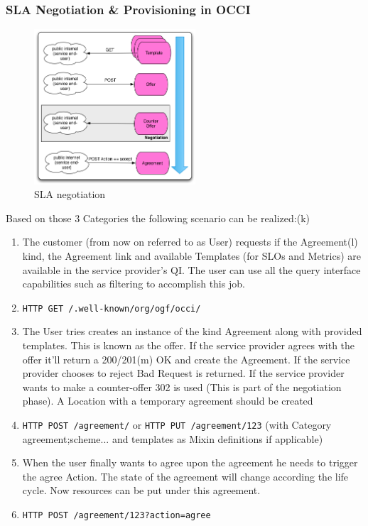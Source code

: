 \documentclass[12pt]{article}  %
\begin{document}
\subsubsection{SLA Negotiation \& Provisioning in OCCI}

\begin{figure}
\centering
\includegraphics[width=60mm]{sla-occi-agreement.png}
\caption{\label{sla-agreement} SLA negotiation}
\end{figure}



Based on those 3 Categories the following scenario can be realized:(k)

\begin{enumerate}
\item The customer (from now on referred to as User) requests if the Agreement(l) kind, the Agreement link and available Templates (for SLOs and Metrics) are available in the service provider’s QI. The user can use all the query interface capabilities such as filtering to accomplish this job.
\item \verb|HTTP GET /.well-known/org/ogf/occi/|
\item The User tries creates an instance of the kind Agreement along with provided templates. This is known as the offer. If the service provider agrees with the offer it’ll return a 200/201(m) OK and create the Agreement. If the service provider chooses to reject Bad Request is returned. If the service provider wants to make a counter-offer 302 is used (This is part of the negotiation phase). A Location with a temporary agreement should be created
\item \verb|HTTP POST /agreement/| or \verb|HTTP PUT /agreement/123| (with Category agreement;scheme... and templates as Mixin definitions if applicable)
\item When the user finally wants to agree upon the agreement he needs to trigger the agree Action. The state of the agreement will change according the life cycle. Now resources can be put under this agreement.
\item \verb|HTTP POST /agreement/123?action=agree|
\end {enumerate}
\end{document}
